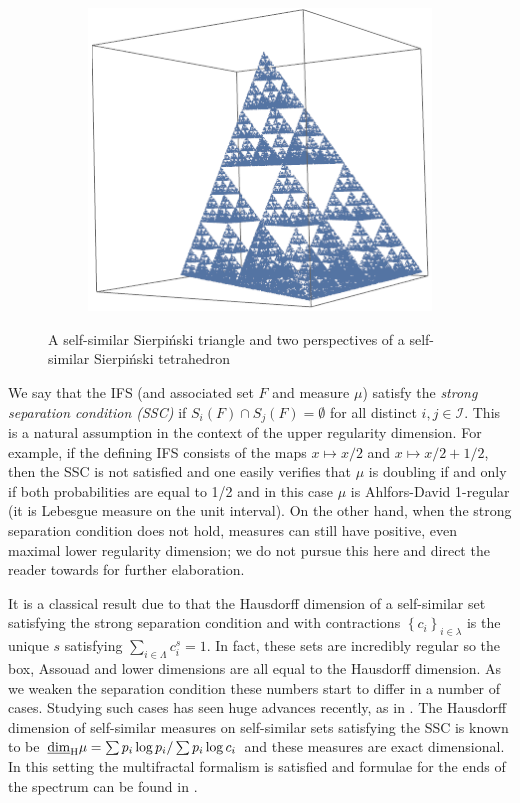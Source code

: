 \begin{figure}[h]
	\begin{subfigure}{.3\textwidth}
		\centering
		\includegraphics[width=.9\linewidth]{pics/ch-upper-reg/sierptetra2.png}
	\end{subfigure}
	\caption{A self-similar Sierpi\'nski triangle and two perspectives of a self-similar Sierpi\'nski tetrahedron}
	\label{ch-upper-reg:fig:test}
\end{figure}

We say that the IFS (and associated set $F$ and measure $\mu$) satisfy the \emph{strong separation condition (SSC)} if $S_i(F) \cap S_j(F) = \emptyset$ for all distinct $i,j \in \mathcal{I}$.  This is a natural assumption in the context of the upper regularity dimension. For example, if the defining IFS consists of the maps $x \mapsto x/2$ and $x \mapsto x/2+1/2$, then the SSC is not satisfied and one easily verifies that $\mu$ is doubling if and only if both probabilities are equal to 1/2 and in this case $\mu$ is Ahlfors-David 1-regular (it is Lebesgue measure on the unit interval). On the other hand, when the strong separation condition does not hold, measures can still have positive, even maximal lower regularity dimension; we do not pursue this here and direct the reader towards \cite{hare-troscheit} for further elaboration.  

It is a classical result due to \cite{hutchinson} that the Hausdorff dimension of a self-similar set satisfying the strong separation condition and with contractions $\left\{c_i \right\}_{i\in \lambda}$ is the unique $s$ satisfying $\sum_{i\in \Lambda} c_i^s = 1$. In fact, these sets are incredibly regular so the box, Assouad and lower dimensions are all equal to the Hausdorff dimension. As we weaken the separation condition these numbers start to differ in a number of cases. Studying such cases has seen huge advances recently, as in \cite{hochman2}. The Hausdorff dimension of self-similar measures on self-similar sets satisfying the SSC is known to be $\underline{\dim}_{\textup{H}} \mu = \sum p_i \log p_i / \sum p_i\log c_i$ and these measures are exact dimensional. In this setting the multifractal formalism is satisfied and formulae for the ends of the spectrum can be found in \cite{cawley-mauldin, olsenformalism}.

